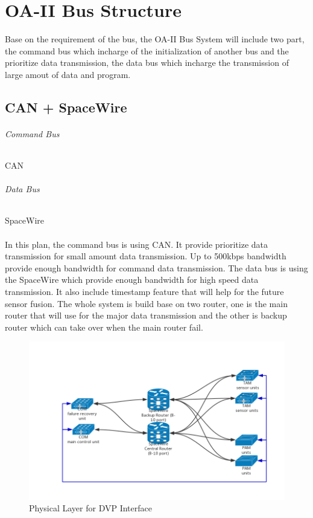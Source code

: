 \documentclass[12pt,article]{memoir}
\begin{document}
\chapter{OA-II Bus Structure}
Base on the requirement of the bus, the OA-II Bus System will include two part, the command bus which incharge of the initialization of another bus and the prioritize data transmission, the data bus which incharge the transmission of large amout of data and program.
\section{CAN + SpaceWire}
\subparagraph{Command Bus}CAN
\subparagraph{Data Bus}SpaceWire\\\\
In this plan, the command bus is using CAN. It provide prioritize data transmission for small amount data transmission. Up to 500kbps bandwidth provide enough bandwidth for command data transmission. The data bus is using the SpaceWire which provide enough bandwidth for high speed data transmission. It also include timestamp feature that will help for the future sensor fusion. The whole system is build base on two router, one is the main router that will use for the major data transmission and the other is backup router which can take over when the main router fail.
\begin{figure}[htp]
\includegraphics[width=\textwidth]{DR00001_SpaceWire_1.png}
 \caption{Physical Layer for DVP Interface}	
\end{figure}
\clearpage
\end{document}

